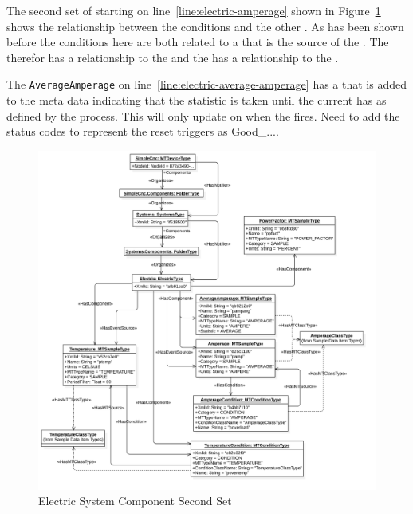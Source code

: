 The second set of  starting on line~\ref{line:electric-amperage} shown in Figure~\ref{fig:electric-system-2} shows the relationship between the conditions and the other . As has been shown before the conditions here are both related to a  that is the source of the . The  therefor has a  relationship to the  and the  has a  relationship to the . 

The \texttt{AverageAmperage} on line~\ref{line:electric-average-amperage} has a  that is added to the meta data indicating that the  statistic is taken until the current  has  as defined by the process. This  will only update on when the  fires. {\color{red} Need to add the status codes to represent the reset triggers as Good_...}.

\begin{figure}[ht]
  \centering
  \includegraphics[width=1.0\textwidth]{diagrams/mtconnect-mapping/electric-system-2.png}
  \caption{Electric System Component Second Set}
  \label{fig:electric-system-2}
\end{figure}

